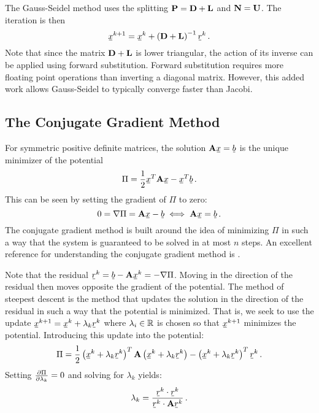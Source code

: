 \documentclass[../doc.tex]{subfiles}
\begin{document}
The Gauss-Seidel method uses the splitting $\boldsymbol{\mathrm{P}} = \boldsymbol{\mathrm{D}} + \boldsymbol{\mathrm{L}}$ and $\boldsymbol{\mathrm{N}} = \boldsymbol{\mathrm{U}}$. The iteration is then 
	\begin{equation}
		\ubar{x}^{k+1} = \ubar{x}^k + \paren{\mat{D} + \mat{L}}^{-1} \ubar{r}^k \,. 
	\end{equation}
Note that since the matrix $\boldsymbol{\mathrm{D}} + \boldsymbol{\mathrm{L}}$ is lower triangular, the action of its inverse can be applied using forward substitution. Forward substitution requires more floating point operations than inverting a diagonal matrix. However, this added work allows Gauss-Seidel to typically converge faster than Jacobi. 

\subsection{The Conjugate Gradient Method}
For symmetric positive definite matrices, the solution $\mat{A}\ubar{x} = \ubar{b}$ is the unique minimizer of the potential 
	\begin{equation}
		\Pi = \frac{1}{2} \ubar{x}^T \mat{A} \ubar{x} - \ubar{x}^T \ubar{b} \,. 
	\end{equation}
This can be seen by setting the gradient of $\Pi$ to zero: 
	\begin{equation}
		0 = \nabla \Pi = \mat{A} \ubar{x} - \ubar{b} \iff \mat{A} \ubar{x} = \ubar{b} \,. 
	\end{equation}
The conjugate gradient method \cite{cg_hs,cgh} is built around the idea of minimizing $\Pi$ in such a way that the system is guaranteed to be solved in at most $n$ steps. An excellent reference for understanding the conjugate gradient method is \textcite{10.5555/865018}. 

Note that the residual $\ubar{r}^k = \ubar{b} - \mat{A}\ubar{x}^k = -\nabla\Pi$. Moving in the direction of the residual then moves opposite the gradient of the potential. The method of steepest descent is the method that updates the solution in the direction of the residual in such a way that the potential is minimized. That is, we seek to use the update $\ubar{x}^{k+1} = \ubar{x}^k + \lambda_k \ubar{r}^k$ where $\lambda_i \in \mathbb{R}$ is chosen so that $\ubar{x}^{k+1}$ minimizes the potential. Introducing this update into the potential: 
	\begin{equation}
		\Pi = \frac{1}{2}\paren{\ubar{x}^k + \lambda_k \ubar{r}^k}^T \mat{A}\paren{\ubar{x}^k + \lambda_k \ubar{r}^k} - \paren{\ubar{x}^k + \lambda_k \ubar{r}^k}^T \ubar{r}^k \,. 
	\end{equation}
Setting $\frac{\partial \Pi}{\partial \lambda_k} = 0$ and solving for $\lambda_k$ yields: 
	\begin{equation}
		\lambda_k = \frac{\ubar{r}^k \cdot \ubar{r}^k}{\ubar{r}^k \cdot \mat{A} \ubar{r}^k} \,. 
	\end{equation}
\end{document}
